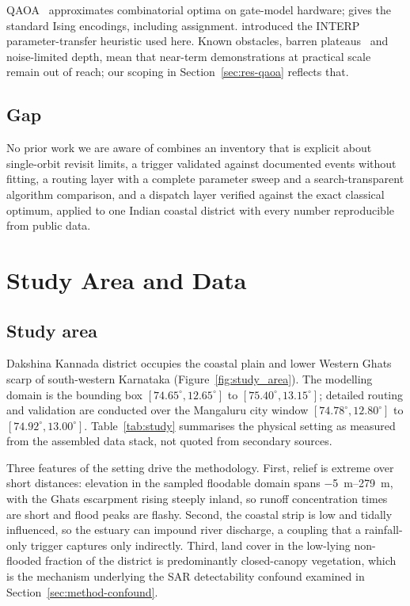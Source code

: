\documentclass[journal]{IEEEtran}
\begin{document}
QAOA~\citep{farhi2014} approximates combinatorial optima on gate-model hardware;
\citet{lucas2014} gives the standard Ising encodings, including assignment.
\citet{zhou2020} introduced the INTERP parameter-transfer heuristic used here.
Known obstacles, barren plateaus~\citep{mcclean2018} and noise-limited depth,
mean that near-term demonstrations at practical scale remain out of reach; our
scoping in Section~\ref{sec:res-qaoa} reflects that.

\subsection{Gap}
No prior work we are aware of combines an inventory that is explicit about
single-orbit revisit limits, a trigger validated against documented events
without fitting, a routing layer with a complete parameter sweep and a
search-transparent algorithm comparison, and a dispatch layer verified against
the exact classical optimum, applied to one Indian coastal district with every
number reproducible from public data.

\section{Study Area and Data}
\label{sec:study}

\subsection{Study area}
Dakshina Kannada district occupies the coastal plain and lower Western Ghats
scarp of south-western Karnataka (Figure~\ref{fig:study_area}). The modelling
domain is the bounding box $[74.65^\circ, 12.65^\circ]$ to
$[75.40^\circ, 13.15^\circ]$; detailed routing and validation are conducted over
the Mangaluru city window $[74.78^\circ, 12.80^\circ]$ to
$[74.92^\circ, 13.00^\circ]$. Table~\ref{tab:study} summarises the physical
setting as measured from the assembled data stack, not quoted from
secondary sources.

Three features of the setting drive the methodology. First, relief is extreme
over short distances: elevation in the sampled floodable domain spans
\SIrange{-5}{279}{\metre}, with the Ghats escarpment rising steeply inland, so
runoff concentration times are short and flood peaks are flashy. Second, the
coastal strip is low and tidally influenced, so the estuary can impound river
discharge, a coupling that a rainfall-only trigger captures only indirectly.
Third, land cover in the low-lying non-flooded fraction of the district is
predominantly closed-canopy vegetation, which is the mechanism underlying the
SAR detectability confound examined in Section~\ref{sec:method-confound}.
\end{document}
